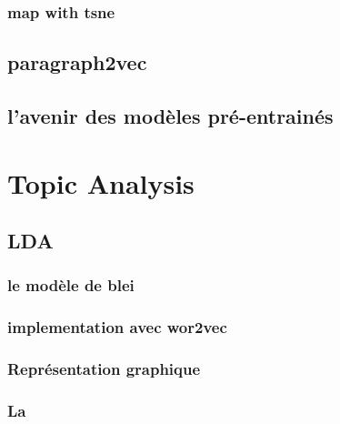 \documentclass[
]{book}
\begin{document}
\hypertarget{map-with-tsne}{%
\subsection{map with tsne}\label{map-with-tsne}}

\hypertarget{paragraph2vec}{%
\section{paragraph2vec}\label{paragraph2vec}}

\hypertarget{lavenir-des-moduxe8les-pruxe9-entrainuxe9s}{%
\section{l'avenir des modèles pré-entrainés}\label{lavenir-des-moduxe8les-pruxe9-entrainuxe9s}}

\hypertarget{topic-analysis}{%
\chapter{Topic Analysis}\label{topic-analysis}}

\hypertarget{lda}{%
\section{LDA}\label{lda}}

\hypertarget{le-moduxe8le-de-blei}{%
\subsection{le modèle de blei}\label{le-moduxe8le-de-blei}}

\hypertarget{implementation-avec-wor2vec}{%
\subsection{implementation avec wor2vec}\label{implementation-avec-wor2vec}}

\hypertarget{repruxe9sentation-graphique}{%
\subsection{Représentation graphique}\label{repruxe9sentation-graphique}}

\hypertarget{la}{%
\subsection{La}\label{la}}
\end{document}
